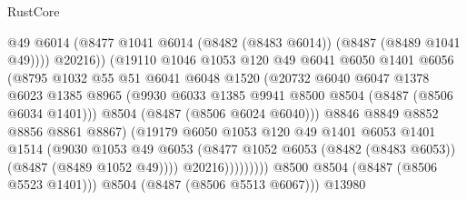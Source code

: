 \begin{lexlean}{RustCore}
\begin{coremodule}
                                  @49
                                  @6014
                                  (@8477
                                    @1041
                                    @6014
                                    (@8482 (@8483 @6014))
                                    (@8487 (@8489 @1041 @49))))
                                @20216))
                            (@19110
                              @1046
                              @1053
                              @120
                              @49
                              @6041
                              @6050
                              @1401
                              @6056
                              (@8795
                                @1032
                                @55
                                @51
                                @6041
                                @6048
                                @1520
                                (@20732
                                  @6040
                                  @6047
                                  @1378
                                  @6023
                                  @1385
                                  @8965
                                  (@9930 @6033 @1385 @9941 @8500 @8504 (@8487 (@8506 @6034 @1401)))
                                  @8504
                                  (@8487 (@8506 @6024 @6040)))
                                @8846
                                @8849
                                @8852
                                @8856
                                @8861
                                @8867)
                              (@19179
                                @6050
                                @1053
                                @120
                                @49
                                @1401
                                @6053
                                @1401
                                @1514
                                (@9030
                                  @1053
                                  @49
                                  @6053
                                  (@8477
                                    @1052
                                    @6053
                                    (@8482 (@8483 @6053))
                                    (@8487 (@8489 @1052 @49))))
                                @20216)))))))))
              @8500
              @8504
              (@8487 (@8506 @5523 @1401)))
            @8504
            (@8487 (@8506 @5513 @6067)))
          @13980

\end{coremodule}
\end{lexlean}
